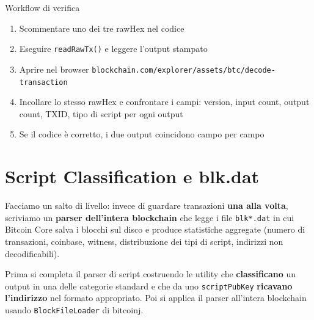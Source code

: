 \documentclass[
  italian,
  openany]{book}
\providecommand{\tightlist}{%
  \setlength{\itemsep}{0pt}\setlength{\parskip}{0pt}}
\begin{document}
\begin{callouttip}{Workflow di verifica}

\begin{enumerate}
\def\labelenumi{\arabic{enumi}.}
\tightlist
\item
  Scommentare uno dei tre rawHex nel codice
\item
  Eseguire \texttt{readRawTx()} e leggere l'output stampato
\item
  Aprire nel browser
  \texttt{blockchain.com/explorer/assets/btc/decode-transaction}
\item
  Incollare lo stesso rawHex e confrontare i campi: version, input
  count, output count, TXID, tipo di script per ogni output
\item
  Se il codice è corretto, i due output coincidono campo per campo
\end{enumerate}

\end{callouttip}

\section{Script Classification e
blk.dat}\label{script-classification-e-blk.dat}

Facciamo un salto di livello: invece di guardare transazioni \textbf{una
alla volta}, scriviamo un \textbf{parser dell'intera blockchain} che
legge i file \texttt{blk*.dat} in cui Bitcoin Core salva i blocchi sul
disco e produce statistiche aggregate (numero di transazioni, coinbase,
witness, distribuzione dei tipi di script, indirizzi non
decodificabili).

Prima si completa il parser di script costruendo le utility che
\textbf{classificano} un output in una delle categorie standard e che da
uno \texttt{scriptPubKey} \textbf{ricavano l'indirizzo} nel formato
appropriato. Poi si applica il parser all'intera blockchain usando
\texttt{BlockFileLoader} di bitcoinj.
\end{document}
